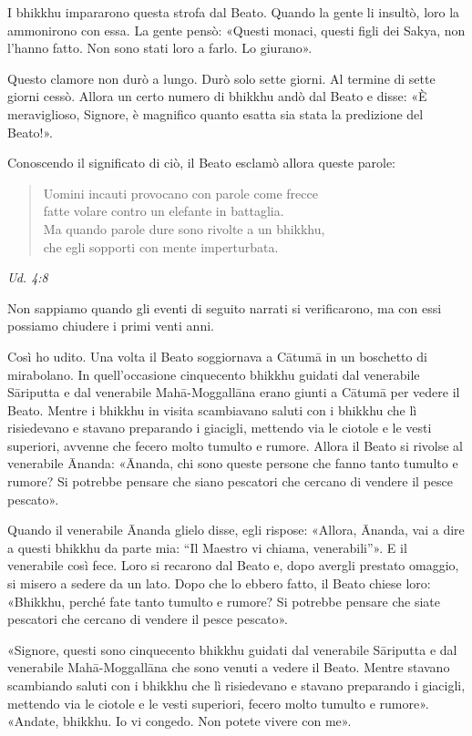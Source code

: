 I bhikkhu impararono questa strofa dal Beato. Quando la gente li
insultò, loro la ammonirono con essa. La gente pensò: «Questi monaci,
questi figli dei Sakya, non l’hanno fatto. Non sono stati loro a farlo.
Lo giurano».


Questo clamore non durò a lungo. Durò solo sette giorni. Al termine di
sette giorni cessò. Allora un certo numero di bhikkhu andò dal Beato e
disse: «È meraviglioso, Signore, è magnifico quanto esatta sia stata la
predizione del Beato!».


Conoscendo il significato di ciò, il Beato esclamò allora queste parole:


\begin{quote}
Uomini incauti provocano con parole come frecce \\
fatte volare contro un elefante in battaglia. \\
Ma quando parole dure sono rivolte a un bhikkhu, \\
che egli sopporti con mente imperturbata.
\end{quote}

\emph{Ud. 4:8}


 Non sappiamo quando gli eventi di seguito narrati si
verificarono, ma con essi possiamo chiudere i primi venti anni.


 Così ho udito. Una volta il Beato soggiornava a Cātumā in un
boschetto di mirabolano. In quell’occasione cinquecento bhikkhu guidati
dal venerabile Sāriputta e dal venerabile Mahā-Moggallāna erano giunti a
Cātumā per vedere il Beato. Mentre i bhikkhu in visita scambiavano
saluti con i bhikkhu che lì risiedevano e stavano preparando i giacigli,
mettendo via le ciotole e le vesti superiori, avvenne che fecero molto
tumulto e rumore. Allora il Beato si rivolse al venerabile Ānanda:
«Ānanda, chi sono queste persone che fanno tanto tumulto e rumore? Si
potrebbe pensare che siano pescatori che cercano di vendere il pesce
pescato».


Quando il venerabile Ānanda glielo disse, egli rispose: «Allora, Ānanda,
vai a dire a questi bhikkhu da parte mia: “Il Maestro vi chiama,
venerabili”». E il venerabile così fece. Loro si recarono dal Beato e,
dopo avergli prestato omaggio, si misero a sedere da un lato. Dopo che
lo ebbero fatto, il Beato chiese loro: «Bhikkhu, perché fate tanto
tumulto e rumore? Si potrebbe pensare che siate pescatori che cercano di
vendere il pesce pescato».


«Signore, questi sono cinquecento bhikkhu guidati dal venerabile
Sāriputta e dal venerabile Mahā-Moggallāna che sono venuti a vedere il
Beato. Mentre stavano scambiando saluti con i bhikkhu che lì risiedevano
e stavano preparando i giacigli, mettendo via le ciotole e le vesti
superiori, fecero molto tumulto e rumore». «Andate, bhikkhu. Io vi
congedo. Non potete vivere con me».


